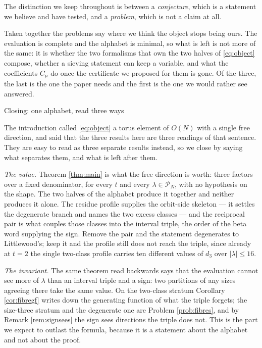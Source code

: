 \documentclass[11pt,reqno]{amsart}
\makeatletter
\renewcommand\section{\@startsection{section}{1}%
  \z@{\linespacing\@plus\linespacing}{.5\linespacing}%
  {\normalfont\large\bfseries\centering}}
\theoremstyle{plain}
\theoremstyle{definition}
\newcommand{\PP}{\mathcal{P}}
\makeatother
\begin{document}
The distinction we keep throughout is between a \emph{conjecture}, which is a statement we believe
and have tested, and a \emph{problem}, which is not a claim at all.

Taken together the problems say where we think the object stops being ours. The evaluation is
complete and the alphabet is minimal, so what is left is not more of the same: it is whether the two
formalisms that own the two halves of \eqref{eq:object} compose, whether a sieving statement can keep
a variable, and what the coefficients $C_\mu$ do once the certificate we proposed for them is gone.
Of the three, the last is the one the paper needs and the first is the one we would rather see
answered.

\section{Closing: one alphabet, read three ways}\label{sec:closing}

The introduction called \eqref{eq:object} a torus element of $O(N)$ with a single free direction, and
said that the three results here are three readings of that sentence. They are easy to read as three
separate results instead, so we close by saying what separates them, and what is left after them.

\emph{The value.} Theorem \ref{thm:main} is what the free direction is worth: three factors over a
fixed denominator, for every $t$ and every $\lambda\in\PP_N$, with no hypothesis on the shape. The
two halves of the alphabet produce it together and neither produces it alone. The residue profile
supplies the orbit-side skeleton --- it settles the degenerate branch and names the two excess
classes --- and the reciprocal pair is what couples those classes into the interval triple, the order
of the beta word supplying the sign. Remove the pair and the statement degenerates to Littlewood's;
keep it and the profile still does not reach the triple, since already at $t=2$ the single two-class
profile carries ten different values of $d_3$ over $|\lambda|\le16$.

\emph{The invariant.} The same theorem read backwards says that the evaluation cannot see more of
$\lambda$ than an interval triple and a sign: two partitions of any sizes agreeing there take the
same value. On the two-class stratum Corollary \ref{cor:fibregf} writes down the generating function
of what the triple forgets; the size-three stratum and the degenerate one are Problem
\ref{prob:fibres}, and by Remark \ref{rem:signsees} the sign sees directions the triple does not.
This is the part we expect to outlast the formula, because it is a statement about the alphabet and
not about the proof.
\end{document}
